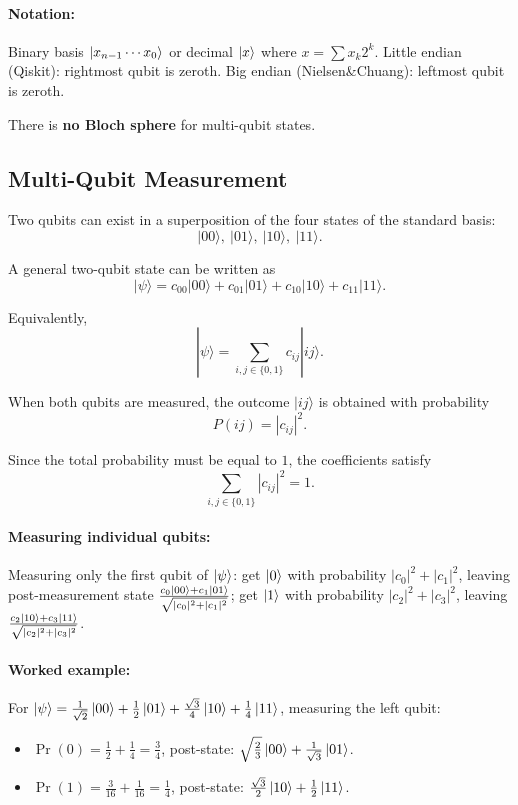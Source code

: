 \documentclass[10pt,a4paper]{article}
\begin{document}
\paragraph{Notation:} Binary basis $\ket{x_{n-1}\cdots x_0}$ or decimal $\ket{x}$ where $x=\sum x_k 2^k$. Little endian (Qiskit): rightmost qubit is zeroth. Big endian (Nielsen\&Chuang): leftmost qubit is zeroth.

There is \textbf{no Bloch sphere} for multi-qubit states.

\subsection{Multi-Qubit Measurement}

Two qubits can exist in a superposition of the four states of the standard basis:
\[
|00\rangle,\ |01\rangle,\ |10\rangle,\ |11\rangle.
\]

A general two-qubit state can be written as
\[
|\psi\rangle
=
c_{00}|00\rangle
+
c_{01}|01\rangle
+
c_{10}|10\rangle
+
c_{11}|11\rangle.
\]

Equivalently,
\[
|\psi\rangle
=
\sum_{i,j \in \{0,1\}} c_{ij}|ij\rangle.
\]

When both qubits are measured, the outcome \(|ij\rangle\) is obtained with probability
\[
P(ij) = |c_{ij}|^2.
\]

Since the total probability must be equal to \(1\), the coefficients satisfy
\[
\sum_{i,j \in \{0,1\}} |c_{ij}|^2 = 1.
\]

\paragraph{Measuring individual qubits:} Measuring only the first qubit of $\ket{\psi}$: get $\ket{0}$ with probability $|c_0|^2+|c_1|^2$, leaving post-measurement state $\frac{c_0\ket{00}+c_1\ket{01}}{\sqrt{|c_0|^2+|c_1|^2}}$; get $\ket{1}$ with probability $|c_2|^2+|c_3|^2$, leaving $\frac{c_2\ket{10}+c_3\ket{11}}{\sqrt{|c_2|^2+|c_3|^2}}$.

\paragraph{Worked example:} For $\ket{\psi}=\frac{1}{\sqrt{2}}\ket{00}+\frac{1}{2}\ket{01}+\frac{\sqrt{3}}{4}\ket{10}+\frac{1}{4}\ket{11}$, measuring the left qubit:
\begin{itemize}[nosep]
\item $\Pr(0)=\frac{1}{2}+\frac{1}{4}=\frac{3}{4}$, post-state: $\sqrt{\frac{2}{3}}\ket{00}+\frac{1}{\sqrt{3}}\ket{01}$.
\item $\Pr(1)=\frac{3}{16}+\frac{1}{16}=\frac{1}{4}$, post-state: $\frac{\sqrt{3}}{2}\ket{10}+\frac{1}{2}\ket{11}$.
\end{itemize}
\end{document}
